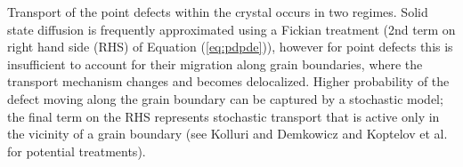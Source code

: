 \documentclass[11pt]{article}
\newcommand{\MarginPar}[1]{\marginpar{%
\vskip-\baselineskip %
\raggedright\tiny\sffamily
\hrule\smallskip{\color{red}#1}\par\smallskip\hrule}}
\begin{document}
Transport of the point defects within the crystal occurs in two
regimes. Solid state diffusion is frequently approximated using a
Fickian treatment (2nd term on right hand side (RHS) of Equation (\ref{eq:pdpde})),
however for point defects this is insufficient to account for their
migration along grain boundaries, where the
transport mechanism changes and becomes delocalized. Higher
probability of the defect moving along the grain boundary can be
captured by a stochastic model; the final term on the RHS represents stochastic transport
that is active only in the vicinity of a grain boundary (see  Kolluri and
Demkowicz \cite{Kolluri12} and Koptelov et al. \cite{Koptelov84} for  potential treatments). 
\end{document}
